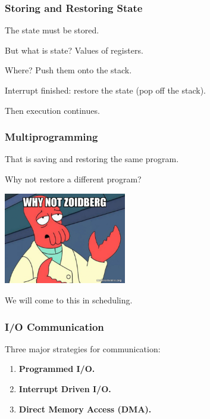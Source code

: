 \begin{frame}
\frametitle{Storing and Restoring State}

The state must be stored. 

But what is state? Values of registers.

Where? Push them onto the stack.

Interrupt finished: restore the state (pop off the stack).

Then execution continues.

\end{frame}

\begin{frame}
\frametitle{Multiprogramming}
That is saving and restoring the same program.

Why not restore a different program?

\begin{center}
	\includegraphics[width=0.4\textwidth]{images/why-not-zoidberg.jpg}
\end{center}

We will come to this in scheduling.


\end{frame}


\begin{frame}
\frametitle{I/O Communication}

Three major strategies for communication: 

\begin{enumerate}
	\item \textbf{Programmed I/O.}
	\item \textbf{Interrupt Driven I/O.}
	\item \textbf{Direct Memory Access (DMA).}
\end{enumerate}

\end{frame}


